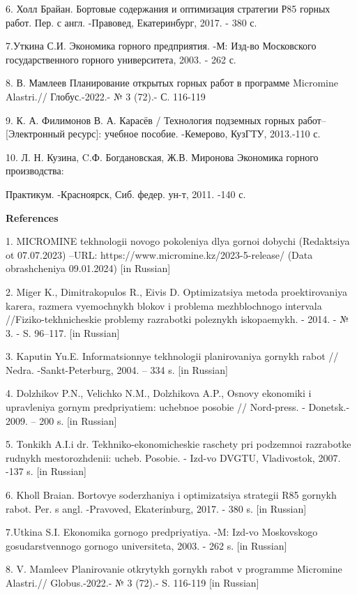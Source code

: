 6. Холл Брайан. Бортовые содержания и оптимизация стратегии Р85 горных
работ. Пер. с англ. -Правовед, Екатеринбург, 2017. - 380 с.

7.Уткина С.И. Экономика горного предприятия. -М: Изд-во Московского
государственного горного университета, 2003. - 262 с.

8. В. Мамлеев Планирование открытых горных работ в программе Micromine
Alastri.// Глобус.-2022.- № 3 (72).- С. 116-119

9. К. А. Филимонов В. А. Карасёв / Технология подземных горных работ--
{[}Электронный ресурс{]}: учебное пособие. -Кемерово, КузГТУ, 2013.-110
с.

10. Л. Н. Кузина, C.Ф. Богдановская, Ж.В. Миронова Экономика горного
производства:

Практикум. -Красноярск, Сиб. федер. ун-т, 2011. -140 с.

{\bfseries References}

1. MICROMINE tekhnologii novogo pokoleniya dlya gornoi dobychi
(Redaktsiya ot 07.07.2023) --URL:
https://www.micromine.kz/2023-5-release/ (Data obrashcheniya 09.01.2024)
{[}in Russian{]}

2. Miger K., Dimitrakopulos R., Eivis D. Optimizatsiya metoda
proektirovaniya kar\textquotesingle era, razmera vyemochnykh blokov i
problema mezhblochnogo intervala //Fiziko-tekhnicheskie problemy
razrabotki poleznykh iskopaemykh. - 2014. - № 3. - S. 96--117. {[}in
Russian{]}

3. Kaputin Yu.E. Informatsionnye tekhnologii planirovaniya gornykh rabot
// Nedra. -Sankt-Peterburg, 2004. -- 334 s. {[}in Russian{]}

4. Dolzhikov P.N., Velichko N.M., Dolzhikova A.P., Osnovy ekonomiki i
upravleniya gornym predpriyatiem: uchebnoe posobie // Nord-press. -
Donetsk.- 2009. -- 200 s. {[}in Russian{]}

5. Tonkikh A.I.i dr. Tekhniko-ekonomicheskie raschety pri podzemnoi
razrabotke rudnykh mestorozhdenii: ucheb. Posobie. - Izd-vo DVGTU,
Vladivostok, 2007. -137 s. {[}in Russian{]}

6. Kholl Braian. Bortovye soderzhaniya i optimizatsiya strategii R85
gornykh rabot. Per. s angl. -Pravoved, Ekaterinburg, 2017. - 380 s.
{[}in Russian{]}

7.Utkina S.I. Ekonomika gornogo predpriyatiya. -M: Izd-vo Moskovskogo
gosudarstvennogo gornogo universiteta, 2003. - 262 s. {[}in Russian{]}

8. V. Mamleev Planirovanie otkrytykh gornykh rabot v programme Micromine
Alastri.// Globus.-2022.- № 3 (72).- S. 116-119 {[}in Russian{]}


